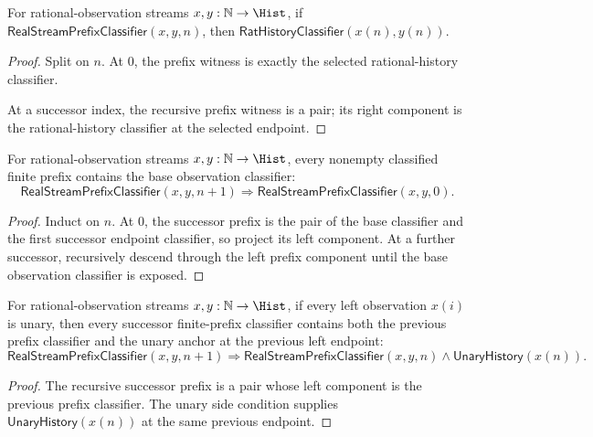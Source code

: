 \begin{theorem}
\label{thm:real-stream-prefix-classifier-endpoint}
For rational-observation streams $x,y:\mathbb{N}\to\Hist$, if
$\mathsf{RealStreamPrefixClassifier}(x,y,n)$, then
$\mathsf{RatHistoryClassifier}(x(n),y(n))$.
\end{theorem}
\begin{proof}
Split on $n$. At $0$, the prefix witness is exactly the selected rational-history
classifier.

At a successor index, the recursive prefix witness is a pair; its right
component is the rational-history classifier at the selected endpoint.
\end{proof}

\begin{theorem}
\label{thm:real-stream-prefix-classifier-base-of-successor}
For rational-observation streams $x,y:\mathbb{N}\to\Hist$, every nonempty
classified finite prefix contains the base observation classifier:
$$
\mathsf{RealStreamPrefixClassifier}(x,y,n+1)
\Longrightarrow
\mathsf{RealStreamPrefixClassifier}(x,y,0).
$$
\end{theorem}
\begin{proof}
Induct on $n$. At $0$, the successor prefix is the pair of the base classifier
and the first successor endpoint classifier, so project its left component. At
a further successor, recursively descend through the left prefix component until
the base observation classifier is exposed.
\end{proof}

\begin{lemma}
\label{lem:real-stream-prefix-previous-with-unary}
For rational-observation streams \(x,y:\mathbb{N}\to\Hist\), if every left observation \(x(i)\) is unary, then every successor finite-prefix classifier contains both the previous prefix classifier and the unary anchor at the previous left endpoint:
$$
\mathsf{RealStreamPrefixClassifier}(x,y,n+1)
\Longrightarrow
\mathsf{RealStreamPrefixClassifier}(x,y,n)\wedge \mathsf{UnaryHistory}(x(n)).
$$
\end{lemma}
\begin{proof}
The recursive successor prefix is a pair whose left component is the previous prefix classifier. The unary side condition supplies \(\mathsf{UnaryHistory}(x(n))\) at the same previous endpoint.
\end{proof}

